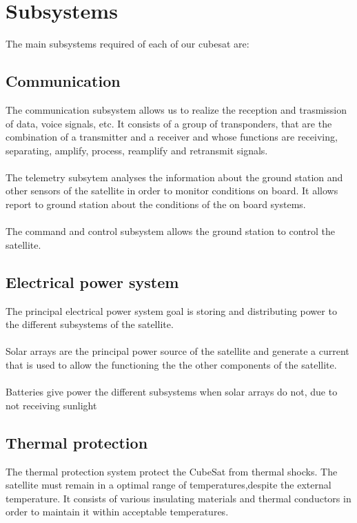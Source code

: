 \section{Subsystems}

The main subsystems required of each of our cubesat are:

\subsection{Communication}
The communication subsystem allows us to realize the reception and trasmission of data, voice signals, etc. It consists of a group of transponders, that are the combination of a transmitter and a receiver and whose functions are receiving, separating, amplify, process, reamplify and retransmit signals.
	\paragraph{} 
	The telemetry subsytem analyses the information about the ground station and other sensors of the satellite in 	order to monitor conditions on board. It allows report to ground station about the conditions of the on board 			systems.
	\paragraph{} 
	The command and control subsystem allows the ground station to control the satellite.
	
\subsection{Electrical power system}
The principal electrical power system  goal is storing and distributing power to the different subsystems of the satellite.
	\paragraph{}
	Solar arrays are the principal power source of the satellite and generate a current that is used to allow the 			functioning the the other components of the satellite.
	\paragraph{}
	Batteries give power the different subsystems when solar arrays do not, due to not receiving sunlight
	
\subsection{Thermal protection}
The thermal protection system protect the CubeSat from thermal shocks. The satellite must remain in a optimal range of temperatures,despite the external temperature. It consists of various insulating materials and thermal conductors in order to maintain it within acceptable temperatures.

